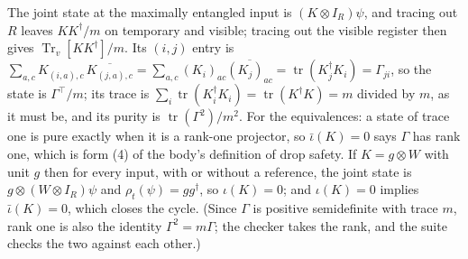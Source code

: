 \documentclass[acmsmall,screen,review,anonymous,nonacm]{acmart}
\begin{document}
The joint state at the maximally entangled input is $(K \otimes I_R)\psi$,
and tracing out $R$ leaves $K K^{\dagger}/m$ on temporary and visible;
tracing out the visible register then gives $\operatorname{Tr}_v[KK^{\dagger}]
/ m$. Its $(i,j)$ entry is $\sum_{a,c} K_{(i,a),c}\,\overline{K_{(j,a),c}} =
\sum_{a,c} (K_i)_{ac} \overline{(K_j)_{ac}} = \operatorname{tr}(K_j^{\dagger}
K_i) = \Gamma_{ji}$, so the state is $\Gamma^{\top}/m$; its trace is
$\sum_i \operatorname{tr}(K_i^{\dagger}K_i) = \operatorname{tr}(K^{\dagger}K)
= m$ divided by $m$, as it must be, and its purity is
$\operatorname{tr}(\Gamma^{2})/m^{2}$. For the equivalences: a state of
trace one is pure exactly when it is a rank-one projector, so $\bar\iota(K)
= 0$ says $\Gamma$ has rank one, which is form (4) of the body's definition
of drop safety. If $K = g \otimes W$ with unit $g$
then for every input, with or without a reference, the joint state is $g
\otimes (W \otimes I_R)\psi$ and $\rho_t(\psi) = gg^{\dagger}$, so $\iota(K)
= 0$; and $\iota(K) = 0$ implies $\bar\iota(K) = 0$, which closes the cycle.
(Since $\Gamma$ is positive semidefinite with trace $m$, rank one is also
the identity $\Gamma^{2} = m\Gamma$; the checker takes the rank, and the
suite checks the two against each other.)
\end{document}
